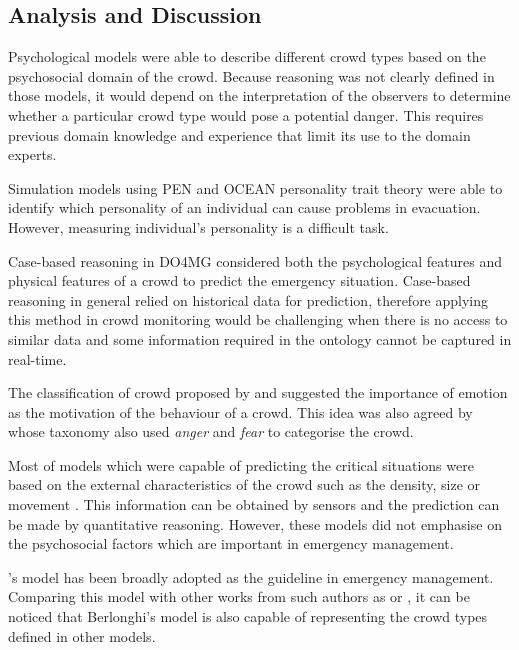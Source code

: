 \subsection{Analysis and Discussion}

Psychological models \citep{Blumer1951,Lofland1985,Momboisse1967} were able to describe different crowd types based on the psychosocial domain of the crowd. Because reasoning was not clearly defined in those models, it would depend on the interpretation of the observers to determine whether a particular crowd type would pose a potential danger. This requires previous domain knowledge and experience that limit its use to the domain experts.

Simulation models using PEN \citep{Guy2011} and OCEAN \citep{Durupinar2008} personality trait theory were able to identify which personality of an individual can cause problems in evacuation. However, measuring individual’s personality is a difficult task.

Case-based reasoning in DO4MG \citep{DelirHaghighi2013a} considered both the psychological features and physical features of a crowd to predict the emergency situation. Case-based reasoning in general relied on historical data for prediction, therefore applying this method in crowd monitoring would be challenging when there is no access to similar data and some information required in the ontology cannot be captured in real-time.

The classification of crowd proposed by \citet{Lofland1985} and \citet{Smelser1998} suggested the importance of emotion as the motivation of the behaviour of a crowd. This idea was also agreed by \citet{Brown1954} whose taxonomy also used \textit{anger} and \textit{fear} to categorise the crowd.

Most of models which were capable of predicting the critical situations were based on the external characteristics of the crowd such as the density, size or movement \citep{Helbing2007,Lee2005}. This information can be obtained by sensors and the prediction can be made by quantitative reasoning. However, these models did not emphasise on the psychosocial factors which are important in emergency management.

\citet{Berlonghi1995}’s model has been broadly adopted as the guideline in emergency management. Comparing this model with other works from such authors as \citet{Blumer1951} or \citet{Momboisse1967}, it can be noticed that Berlonghi's model is also capable of representing the crowd types defined in other models. 

